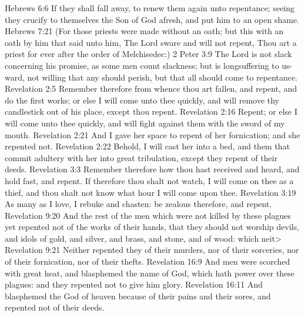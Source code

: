 {Hebrews 6:6 If they shall fall away, to renew them again unto repentance; seeing they crucify to themselves the Son of God afresh, and put him to an open shame.
Hebrews 7:21 (For those priests were made without an oath; but this with an oath by him that said unto him, The Lord sware and will not repent, Thou art a priest for ever after the order of Melchisedec:)
2 Peter 3:9 The Lord is not slack concerning his promise, as some men count slackness; but is longsuffering to us-ward, not willing that any should perish, but that all should come to repentance.
Revelation 2:5 Remember therefore from whence thou art fallen, and repent, and do the first works; or else I will come unto thee quickly, and will remove thy candlestick out of his place, except thou repent.
Revelation 2:16 Repent; or else I will come unto thee quickly, and will fight against them with the sword of my mouth.
Revelation 2:21 And I gave her space to repent of her fornication; and she repented not.
Revelation 2:22 Behold, I will cast her into a bed, and them that commit adultery with her into great tribulation, except they repent of their deeds.
Revelation 3:3 Remember therefore how thou hast received and heard, and hold fast, and repent. If therefore thou shalt not watch, I will come on thee as a thief, and thou shalt not know what hour I will come upon thee.
Revelation 3:19 As many as I love, I rebuke and chasten: be zealous therefore, and repent.
Revelation 9:20 And the rest of the men which were not killed by these plagues yet repented not of the works of their hands, that they should not worship devils, and idols of gold, and silver, and brass, and stone, and of wood: which neit>
Revelation 9:21 Neither repented they of their murders, nor of their sorceries, nor of their fornication, nor of their thefts.
Revelation 16:9 And men were scorched with great heat, and blasphemed the name of God, which hath power over these plagues: and they repented not to give him glory.
Revelation 16:11 And blasphemed the God of heaven because of their pains and their sores, and repented not of their deeds.

}

